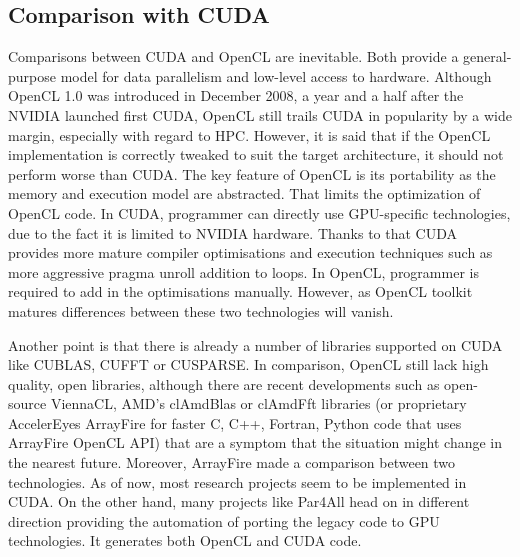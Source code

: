 
\subsection{Comparison with CUDA}
Comparisons between CUDA and OpenCL are inevitable. Both provide a general-purpose model for data parallelism and low-level access to hardware. Although OpenCL 1.0 was introduced in December 2008, a year and a half after the NVIDIA launched first CUDA, OpenCL still trails CUDA in popularity by a wide margin, especially with regard to HPC. However, it is said that if the OpenCL implementation is correctly tweaked to suit the target architecture, it should not perform worse than CUDA. The key feature of OpenCL is its portability as the memory and execution model are abstracted. That limits the optimization of OpenCL code. In CUDA, programmer can directly use GPU-specific technologies, due to the fact it is limited to NVIDIA hardware. Thanks to that CUDA provides more mature compiler optimisations and execution techniques such as more aggressive pragma unroll addition to loops. In OpenCL, programmer is required to add in the optimisations manually. However, as OpenCL toolkit matures differences between these two technologies will vanish.

Another point is that there is already a number of libraries supported on CUDA like CUBLAS, CUFFT or CUSPARSE. In comparison, OpenCL still lack high quality, open libraries, although there are recent developments such as open-source ViennaCL, AMD's clAmdBlas or clAmdFft libraries (or proprietary AccelerEyes ArrayFire for faster C, C++, Fortran, Python code that uses ArrayFire OpenCL API) that are a symptom that the situation might change in the nearest future. Moreover, ArrayFire made a comparison between two technologies. As of now, most research projects seem to be implemented in CUDA. On the other hand, many projects like Par4All head on in different direction providing the automation of porting the legacy code to GPU technologies. It generates both OpenCL and CUDA code. 


